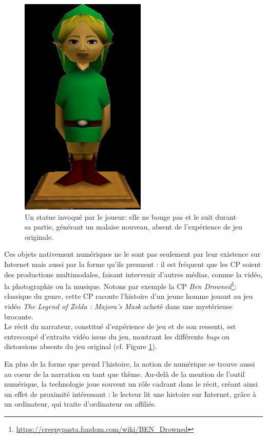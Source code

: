 \documentclass[12pt,a4paper,oneside,titlepage]{book} %
\begin{document}
	\begin{figure}
	\centering
	\includegraphics[scale=0.35]{illustration/ben_drowned1}
	\caption{\small Un statue invoqué par le joueur: elle ne bouge pas et le suit durant sa partie, générant un malaise nouveau, absent de l'expérience de jeu originale.}
	\label{img:ben_drowned}
\end{figure}

Ces objets nativement numériques ne le sont pas seulement par leur existence sur Internet mais aussi par la forme qu’ils prennent : il est fréquent que les CP soient des productions multimodales, faisant intervenir d’autres médias, comme la vidéo, la photographie ou la musique. Notons par exemple la CP \emph{Ben Drowned}\footnote{\url{https://creepypasta.fandom.com/wiki/BEN_Drowned}}: classique du genre, cette CP raconte l’histoire d’un jeune homme jouant au jeu vidéo \emph{The Legend of Zelda : Majora's Mask} acheté dans une mystérieuse brocante. \\
Le récit du narrateur, constitué d'expérience de jeu et de son ressenti, est entrecoupé d'extraits vidéo issus du jeu, montrant les différents \textit{bugs} ou distorsions absents du jeu original (cf. Figure \ref{img:ben_drowned}).

En plus de la forme que prend l'histoire, la notion de numérique se trouve aussi au coeur de la narration en tant que thème. Au-delà de la mention de l'outil numérique, la technologie joue souvent un rôle cadrant dans le récit, créant ainsi un effet de proximité intéressant : le lecteur lit une histoire sur Internet, grâce à un ordinateur, qui traite d'ordinateur ou affiliés.
\end{document}
